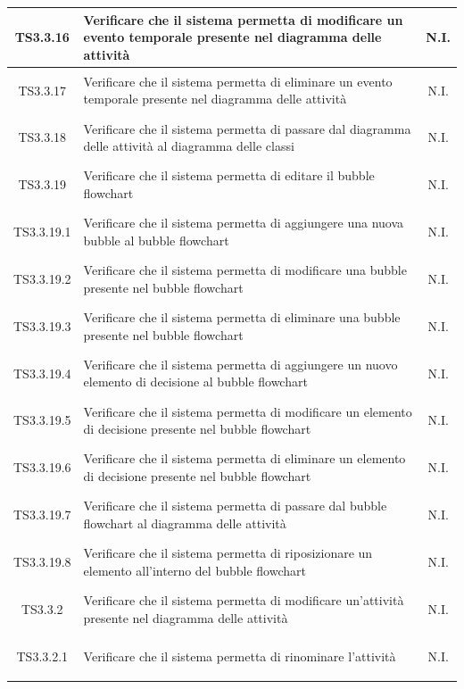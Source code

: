 \documentclass[../PianoDiQualifica.tex]{subfiles}
\begin{document}
\begin{longtable}{|c|>{\centering}p{10cm}|c|}
	\hline
	\hypertarget{TS3.3.16}{TS3.3.16} & Verificare che il sistema permetta di modificare un evento temporale presente nel diagramma delle attività & N.I. \\
	\hline
	\hypertarget{TS3.3.17}{TS3.3.17} & Verificare che il sistema permetta di eliminare un evento temporale presente nel diagramma delle attività & N.I. \\
	\hline
	\hypertarget{TS3.3.18}{TS3.3.18} & Verificare che il sistema permetta di passare dal diagramma delle attività al diagramma delle classi & N.I. \\
	\hline
	\hypertarget{TS3.3.19}{TS3.3.19} & Verificare che il sistema permetta di editare il bubble flowchart & N.I. \\
	\hline
	\hypertarget{TS3.3.19.1}{TS3.3.19.1} & Verificare che il sistema permetta di aggiungere una nuova bubble al bubble flowchart & N.I. \\
	\hline
	\hypertarget{TS3.3.19.2}{TS3.3.19.2} & Verificare che il sistema permetta di modificare una bubble presente nel bubble flowchart & N.I. \\
	\hline
	\hypertarget{TS3.3.19.3}{TS3.3.19.3} & Verificare che il sistema permetta di eliminare una bubble presente nel bubble flowchart & N.I. \\
	\hline
	\hypertarget{TS3.3.19.4}{TS3.3.19.4} & Verificare che il sistema permetta di aggiungere un nuovo elemento di decisione al bubble flowchart & N.I. \\
	\hline
	\hypertarget{TS3.3.19.5}{TS3.3.19.5} & Verificare che il sistema permetta di modificare un elemento di decisione presente nel bubble flowchart & N.I. \\
	\hline
	\hypertarget{TS3.3.19.6}{TS3.3.19.6} & Verificare che il sistema permetta di eliminare un elemento di decisione presente nel bubble flowchart & N.I. \\
	\hline
	\hypertarget{TS3.3.19.7}{TS3.3.19.7} & Verificare che il sistema permetta di passare dal bubble flowchart al diagramma delle attività & N.I. \\
	\hline
	\hypertarget{TS3.3.19.8}{TS3.3.19.8} & Verificare che il sistema permetta di riposizionare un elemento all'interno del bubble flowchart & N.I. \\
	\hline
	\hypertarget{TS3.3.2}{TS3.3.2} & Verificare che il sistema permetta di modificare un'attività presente nel diagramma delle attività & N.I. \\
	\hline
	\hypertarget{TS3.3.2.1}{TS3.3.2.1} & Verificare che il sistema permetta di rinominare l'attività & N.I. \\

\end{longtable}
\end{document}
